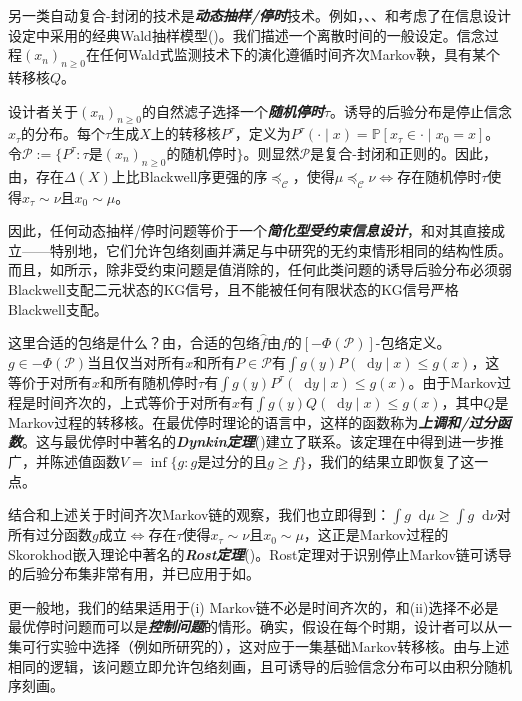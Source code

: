 \documentclass[12pt,letterpaper]{article}
\newenvironment{translation}{\color{blue}}{}
\theoremstyle{plain}
\theoremstyle{definition}
\theoremstyle{remark}
\renewcommand{\P}{\mathds{P}}
\newcommand{\C}{\mathcal{C}}
\renewcommand*\d{\mathop{}\!\mathrm{d}}
\theoremstyle{definition}
\begin{document}
\begin{translation}
另一类自动复合-封闭的技术是\textit{\textbf{动态抽样/停时}}技术。例如，\citet{brocas2007influence}、\citet{henry2019research}、\citet{morris2019wald}和\citet{ball2021experimental}考虑了在信息设计设定中采用的经典Wald抽样模型(\citealt{Wald})。我们描述一个离散时间的一般设定。信念过程$(x_n)_{n \geq 0}$在任何Wald式监测技术下的演化遵循时间齐次Markov鞅，具有某个转移核$Q$。

设计者关于$(x_n)_{n \geq 0}$的自然滤子选择一个\textit{\textbf{随机停时}}$\tau$。诱导的后验分布是停止信念$x_\tau$的分布。每个$\tau$生成$X$上的转移核$P^\tau$，定义为$P^\tau(\cdot \mid x) = \P[x_\tau \in \cdot \mid x_0 = x]$。令$\mathcal{P} := \{P^\tau: \tau \text{是}(x_n)_{n\geq 0}\text{的随机停时}\}$。则显然$\mathcal{P}$是复合-封闭和正则的。因此，由，存在$\Delta(X)$上比Blackwell序更强的序$\preceq_\C$，使得$\mu \preceq_\C \nu \iff$存在随机停时$\tau$使得$x_\tau \sim \nu$且$x_0 \sim \mu$。

因此，任何动态抽样/停时问题等价于一个\textit{\textbf{简化型受约束信息设计}}，和对其直接成立——特别地，它们允许包络刻画并满足与\citet{Kamenica2011}中研究的无约束情形相同的结构性质。而且，如所示，除非受约束问题是值消除的，任何此类问题的诱导后验分布必须弱Blackwell支配二元状态的KG信号，且不能被任何有限状态的KG信号严格Blackwell支配。

这里合适的包络是什么？由，合适的包络$\widehat{f}$由$f$的$[-\Phi(\mathcal{P})]$-包络定义。$g \in -\Phi(\mathcal{P})$当且仅当对所有$x$和所有$P \in \mathcal{P}$有$\int g(y) P(\d y\mid x) \leq g(x)$，这等价于对所有$x$和所有随机停时$\tau$有$\int g(y) P^\tau(\d y\mid x) \leq g(x)$。由于Markov过程是时间齐次的，上式等价于对所有$x$有$\int g(y) Q(\d y\mid x) \leq g(x)$，其中$Q$是Markov过程的转移核。在最优停时理论的语言中，这样的函数称为\textit{\textbf{上调和/过分函数}}。这与最优停时中著名的\textit{\textbf{Dynkin定理}}(\citealt{dynkin1963optimal})建立了联系。该定理在\citet{dayanik2003optimal}中得到进一步推广，并陈述值函数$V = \inf\{g : g \text{是过分的且} g \geq f\}$，我们的结果立即恢复了这一点。

结合和上述关于时间齐次Markov链的观察，我们也立即得到：$\int g \d \mu \geq \int g \d \nu$对所有过分函数$g$成立$\iff$存在$\tau$使得$x_\tau \sim \nu$且$x_0 \sim \mu$，这正是Markov过程的Skorokhod嵌入理论中著名的\textit{\textbf{Rost定理}}(\citealt{rost1971stopping})。Rost定理对于识别停止Markov链可诱导的后验分布集非常有用，并已应用于如\citet{morris2019wald}。

更一般地，我们的结果适用于(i) Markov链不必是时间齐次的，和(ii)选择不必是最优停时问题而可以是\textit{\textbf{控制问题}}的情形。确实，假设在每个时期，设计者可以从一集可行实验中选择（例如\citealt*{ni2023sequential}所研究的），这对应于一集基础Markov转移核。由与上述相同的逻辑，该问题立即允许包络刻画，且可诱导的后验信念分布可以由积分随机序刻画。
\end{translation}
\end{document}
